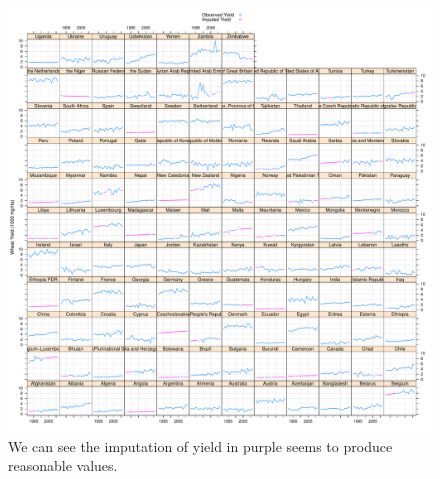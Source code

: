 \documentclass[nojss]{jss}\usepackage[]{graphicx}\usepackage[]{color}
\makeatletter
\def\maxwidth{ %
  \ifdim\Gin@nat@width>\linewidth
    \linewidth
  \else
    \Gin@nat@width
  \fi
}
\newenvironment{knitrout}{}{} %
\makeatother
\begin{document}
\begin{knitrout}
\color{fgcolor}\begin{figure}[!ht]


{\centering \includegraphics[width=\maxwidth]{figure/wheat-yield-imputed} 

}

\caption[We can see the imputation of yield in purple seems to produce reasonable values]{We can see the imputation of yield in purple seems to produce reasonable values.\label{fig:wheat-yield-imputed}}
\end{figure}


\end{knitrout}
\end{document}
